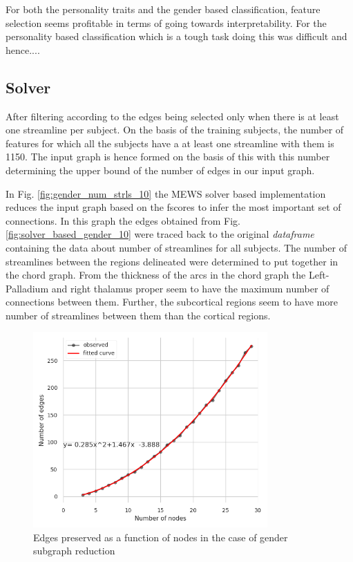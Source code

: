 \documentclass[msthesis.tex]{subfiles}
\begin{document}
For both the personality traits and the gender based classification, feature selection seems profitable in terms of going towards interpretability. For the personality based classification which is a tough task doing this was difficult and hence....

\subsection{Solver}
After filtering according to the edges being selected only when there is at least one streamline per subject. On the basis of the training subjects, the number of features for which all the subjects have a at least one streamline with them is 1150. The input graph is hence formed on the basis of this with this number determining the upper bound of the number of edges in our input graph. 

In Fig. \ref{fig:gender_num_strls_10} the MEWS solver based implementation reduces the input graph based on the fscores to infer the most important set of connections. In this graph the edges obtained from Fig. \ref{fig:solver_based_gender_10} were traced back to the original \textit{dataframe} containing the data about number of streamlines for all subjects. The number of streamlines between the regions delineated were determined to put together in the chord graph. From the thickness of the arcs in the chord graph the Left-Palladium and right thalamus proper seem to have the maximum number of connections between them. Further, the subcortical regions seem to have more number of streamlines between them than the cortical regions. 


\begin{figure}
    \centering
    \includegraphics[width=0.8\textwidth]{images/Gender_nodes_preserved.png}
    \caption{Edges preserved as a function of nodes in the case of gender subgraph reduction}
    \label{fig:fun_num_edges}
\end{figure}
\end{document}

